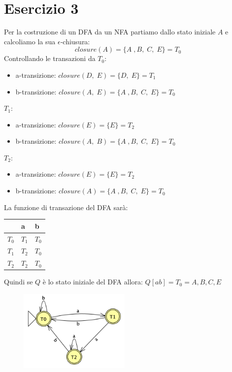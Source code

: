 \documentclass[11pt]{article}
\begin{document}
\section*{Esercizio 3}
Per la costruzione di un DFA da un NFA partiamo dallo
stato iniziale $A$ e calcoliamo la sua $\epsilon$-chiusura:
$$closure(A) = \{A\;,B,\;C,\;E\} = T_0$$
Controllando le transazioni da $T_0$:
\begin{itemize}
  \item a-transizione: $closure(D,\;E) = \{D,\;E\} = T_1$
  \item b-transizione: $closure(A,\;E) = \{A\;,B,\;C,\;E\} = T_0$
\end{itemize}
$T_1$:
\begin{itemize}
  \item a-transizione: $closure(E) = \{E\} = T_2$
  \item b-transizione: $closure(A,\;B) = \{A\;,B,\;C,\;E\} = T_0$
\end{itemize}
$T_2$:
\begin{itemize}
  \item a-transizione: $closure(E) = \{E\} = T_2$
  \item b-transizione: $closure(A) = \{A\;,B,\;C,\;E\} = T_0$
\end{itemize}
La funzione di transazione del DFA sarà:
\begin{table}[H]
  \centering
  \begin{tabularx}{\textwidth}{|>{\centering\arraybackslash}X|>{\centering\arraybackslash}X|>{\centering\arraybackslash}X|}
  \hline
  & \textbf{a} & \textbf{b}  \\
  \hline
  $T_0$ & $T_1$ & $T_0$\\
  \hline
  $T_1$ & $T_2$ & $T_0$ \\
  \hline
  $T_2$ & $T_2$ & $T_0$ \\
  \hline
  \end{tabularx}
  \label{tab:03-parsing-table}
\end{table}
\noindent Quindi se $Q$ è lo stato iniziale del DFA allora: $Q[ab] = T_0 = {A, B, C, E}$
\begin{figure}[H]
  \centering
  \includegraphics[height=4cm]{img/03DFA.png}
  \label{fig:03-DFA}
\end{figure} 
\end{document}
